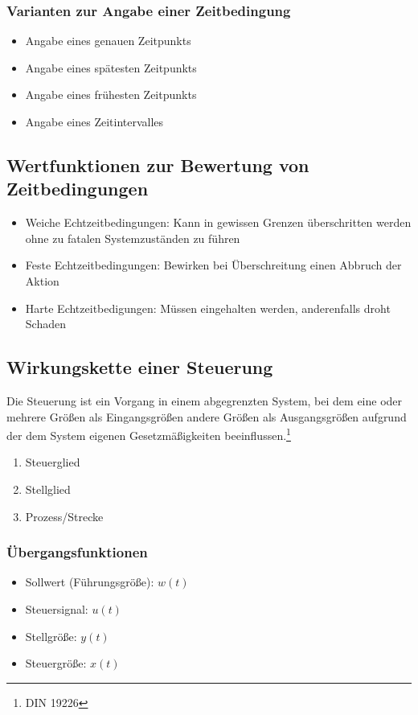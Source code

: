 \subsubsection{Varianten zur Angabe einer Zeitbedingung}
\begin{itemize}
	\item Angabe eines genauen Zeitpunkts
	\item Angabe eines spätesten Zeitpunkts
	\item Angabe eines frühesten Zeitpunkts
	\item Angabe eines Zeitintervalles
\end{itemize}

\subsection{Wertfunktionen zur Bewertung von Zeitbedingungen}
\begin{itemize}
	\item Weiche Echtzeitbedingungen: Kann in gewissen Grenzen überschritten werden ohne zu fatalen Systemzuständen zu führen
	\item Feste Echtzeitbedingungen: Bewirken bei Überschreitung einen Abbruch der Aktion
	\item Harte Echtzeitbedigungen: Müssen eingehalten werden, anderenfalls droht Schaden
\end{itemize}


\subsection{Wirkungskette einer Steuerung}
Die Steuerung ist ein Vorgang in einem abgegrenzten System, bei dem eine oder mehrere Größen als Eingangsgrößen andere Größen als Ausgangsgrößen aufgrund der dem System eigenen Gesetzmäßigkeiten beeinflussen.\footnote{DIN 19226}
\begin{enumerate}
	\item Steuerglied
	\item Stellglied
	\item Prozess/Strecke
\end{enumerate}

\subsubsection{Übergangsfunktionen}
\begin{itemize}
	\item Sollwert (Führungsgröße): \(w(t)\)
	\item Steuersignal: \(u(t)\)
	\item Stellgröße: \(y(t)\)
	\item Steuergröße: \(x(t)\)
\end{itemize}

